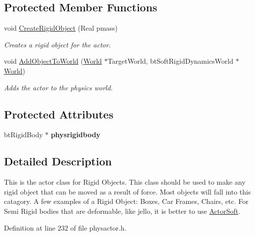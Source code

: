 \subsection*{Protected Member Functions}
\begin{DoxyCompactItemize}
\item 
void \hyperlink{classActorRigid_a57d5fe315a120e97bf34e1930a7678d8}{CreateRigidObject} (Real pmass)
\begin{DoxyCompactList}\small\item\em Creates a rigid object for the actor. \item\end{DoxyCompactList}\item 
void \hyperlink{classActorRigid_a2dc29c81eae90d3344fda0a80f066448}{AddObjectToWorld} (\hyperlink{classphys_1_1World}{World} $\ast$TargetWorld, btSoftRigidDynamicsWorld $\ast$\hyperlink{classphys_1_1World}{World})
\begin{DoxyCompactList}\small\item\em Adds the actor to the physics world. \item\end{DoxyCompactList}\end{DoxyCompactItemize}
\subsection*{Protected Attributes}
\begin{DoxyCompactItemize}
\item 
\hypertarget{classActorRigid_a6942757e081b5261dbf266f197dc56ab}{
btRigidBody $\ast$ {\bfseries physrigidbody}}
\label{d5/d10/classActorRigid_a6942757e081b5261dbf266f197dc56ab}

\end{DoxyCompactItemize}


\subsection{Detailed Description}
This is the actor class for Rigid Objects. This class should be used to make any rigid object that can be moved as a result of force. Most objects will fall into this catagory. A few examples of a Rigid Object: Boxes, Car Frames, Chairs, etc. For Semi Rigid bodies that are deformable, like jello, it is better to use \hyperlink{classActorSoft}{ActorSoft}. 

Definition at line 232 of file physactor.h.



